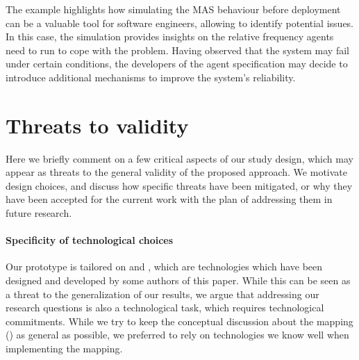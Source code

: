 The example highlights
how simulating the \ac{MAS} behaviour before deployment
can be a valuable tool for software engineers,
allowing to identify potential issues.
%
In this case, the simulation provides insights
on the relative frequency agents need to run to cope with the problem.
Having observed that the system may fail under certain conditions,
the developers of the agent specification may decide to introduce additional mechanisms
to improve the system's reliability.

\section{Threats to validity}
\label{sec:limitations}


Here we briefly comment on a few critical aspects of our study design,
which may appear as threats to the general validity of the proposed approach.
We motivate design choices, and discuss how specific threats have been mitigated,
or why they have been accepted for the current work
with the plan of addressing them in future research.

\paragraph{Specificity of technological choices}

Our prototype is tailored on \jakta{} and \alchemist{},
which are technologies which have been designed and developed by some authors of this paper.
%
While this can be seen as a threat to the generalization of our results,
we argue that addressing our research questions
is also a technological task,
which requires technological commitments.
%
While we try to keep the conceptual discussion about the mapping
()
as general as possible,
we preferred to rely on technologies we know well when implementing the mapping.

